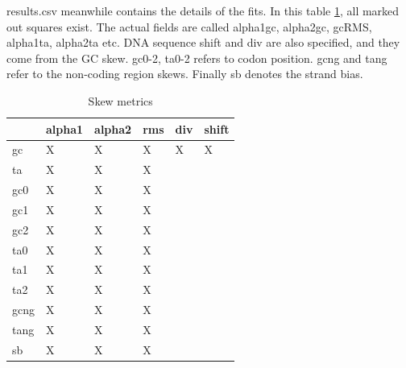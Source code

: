 \documentclass[fleqn,10pt]{wlscirep}
\begin{document}
results.csv meanwhile contains the details of the fits. In this table \ref{tab:skew-table}, all marked out squares exist. The actual fields
are called alpha1gc, alpha2gc, gcRMS, alpha1ta, alpha2ta etc. DNA sequence shift and div are also specified, and they come from the GC skew.
gc0-2, ta0-2 refers to codon position. gcng and tang refer to the non-coding region skews. Finally sb denotes the strand bias. 

\begin{table}[H]
  \centering
\begin{tabular}{|l|l|l|l|ll}
\hline
     & alpha1 & alpha2 & rms & \multicolumn{1}{l|}{div} & \multicolumn{1}{l|}{shift} \\ \hline
gc   & X      &  X     &  X  & \multicolumn{1}{l|}{X}   & \multicolumn{1}{l|}{X}     \\ \hline
ta   & X      &  X     &  X  &                          &                            \\ \cline{1-4}
gc0  & X      &  X     &  X  &                          &                            \\ \cline{1-4}
gc1  & X      &  X     &  X  &                          &                            \\ \cline{1-4}
gc2  & X      &  X     &  X  &                          &                            \\ \cline{1-4}
ta0  & X      &  X     &  X  &                          &                            \\ \cline{1-4}
ta1  & X      &  X     &  X  &                          &                            \\ \cline{1-4}
ta2  & X      &  X     &  X  &                          &                            \\ \cline{1-4}
gcng & X      &  X     &  X  &                          &                            \\ \cline{1-4}
tang & X      &  X     &  X  &                          &                            \\ \cline{1-4}
sb   & X      &  X     &  X  &                          &                            \\ \cline{1-4}
\end{tabular}
\caption{Skew metrics}
\label{tab:skew-table}
\end{table}
\end{document}
